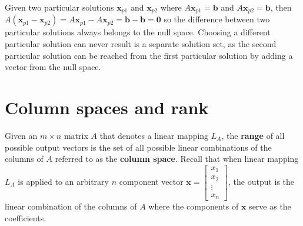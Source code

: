 \documentclass{article}
\begin{document}
Given two particular solutions \(\mathbf{x}_{p1}\) and \(\mathbf{x}_{p2}\) where \(A\mathbf{x}_{p1} = \mathbf{b}\) and \(A\mathbf{x}_{p2} = \mathbf{b}\), then \(A(\mathbf{x}_{p1} - \mathbf{x}_{p2}) = A\mathbf{x}_{p1} - A\mathbf{x}_{p2} = \mathbf{b} - \mathbf{b} = \mathbf{0}\) so the difference between two particular solutions always belongs to the null space. Choosing a different particular solution can never result is a separate solution set, as the second particular solution can be reached from the first particular solution by adding a vector from the null space.     




\section*{Column spaces and rank}

Given an \(m \times n\) matrix \(A\) that denotes a linear mapping \(L_A\), the {\bf range} of all possible output vectors is the set of all possible linear combinations of the columns of \(A\) referred to as the {\bf column space}. Recall that when linear mapping \(L_A\) is applied to an arbitrary \(n\) component vector \(\mathbf{x} = \begin{bmatrix} x_1 \\ x_2 \\ \vdots \\ x_n \end{bmatrix}\), the output is the linear combination of the columns of \(A\) where the components of \(\mathbf{x}\) serve as the coefficients.
\end{document}
